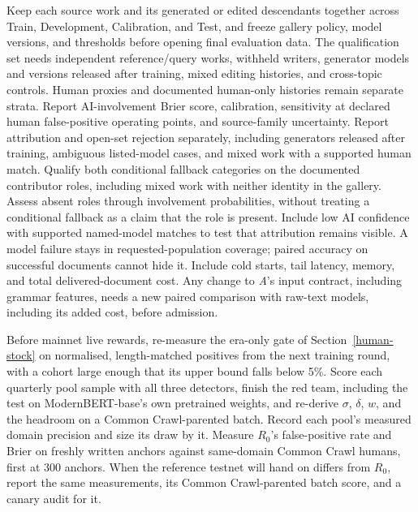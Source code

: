 Keep each source work and its generated or edited descendants together across
Train, Development, Calibration, and Test, and freeze gallery policy, model
versions, and thresholds before opening final evaluation data. The qualification
set needs independent reference/query works, withheld writers, generator models and
versions released after training, mixed editing histories, and cross-topic controls.
Human proxies and documented human-only histories remain separate strata.
Report AI-involvement Brier score, calibration, sensitivity at declared human
false-positive operating points, and source-family uncertainty. Report
attribution and open-set rejection separately, including generators released
after training,
ambiguous listed-model cases, and mixed work with a supported human match.
Qualify both conditional fallback categories on the documented contributor
roles, including mixed work with neither identity in the gallery. Assess absent
roles through involvement probabilities, without treating a conditional
fallback as a claim that the role is present. Include low AI confidence with
supported named-model matches to test that attribution remains visible. A model
failure stays in requested-population coverage; paired accuracy on successful
documents cannot hide it. Include cold starts, tail latency, memory, and total
delivered-document cost. Any change to \textit{A}'s input contract, including
grammar features, needs a new paired comparison with raw-text models, including
its added cost, before admission.

Before mainnet live rewards, re-measure the era-only gate of
Section~\ref{human-stock} on normalised, length-matched positives from the next
training round, with a cohort large enough that its upper bound falls below
5\%. Score each quarterly pool sample with all three detectors, finish the red team,
including the test on ModernBERT-base's own pretrained weights, and re-derive
\(\sigma\), \(\delta\), \(w\), and the headroom on a Common Crawl-parented batch.
Record each pool's measured domain precision and size its draw by it. Measure
\(R_0\)'s false-positive rate and Brier on freshly written anchors against
same-domain Common Crawl humans, first at 300 anchors. When the reference
testnet will hand on differs from \(R_0\), report the same measurements, its
Common Crawl-parented batch score, and a canary audit for it.

